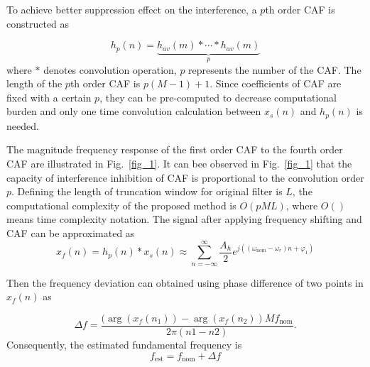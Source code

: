 \documentclass[journal,twoside]{IEEEtran}
\begin{document}
To achieve better suppression effect on the interference, a $p$th order CAF is constructed as

\begin{equation}
h_p(n)=\underbrace{h_{av}(m)*\cdots*h_{av}(m)}_{p}\label{eqn_9}
\end{equation}
where $*$ denotes convolution operation, $p$ represents the number of the CAF. The  length of the $p$th order CAF is $p(M-1)+1$. Since coefficients of CAF are fixed with a certain $p$, they can be pre-computed to decrease computational burden and only one time convolution calculation between $x_s(n)$ and $h_p(n)$ is needed. 

The magnitude frequency response of the first order CAF to the fourth order CAF are illustrated in Fig.~\ref{fig_1}. It can bee observed in Fig.~\ref{fig_1} that the capacity of interference inhibition  of CAF is proportional to the convolution order $p$. Defining the length of truncation window  for original filter is $L$, the computational complexity of the proposed method is $O(pML)$, where  $O( )$ means time complexity
notation.
The signal after applying frequency shifting and CAF  can be approximated  as
\begin{equation}
x_f(n)=h_p(n)*x_s(n)\approx\sum_{n=-\infty}^{\infty}\dfrac{A_h}{2}e^{j\left((\omega_\mathrm{nom}-\omega_r)n+\varphi_1\right)}\label{eqn_10}
\end{equation}


Then the frequency deviation can obtained using phase difference of two points in $x_f(n)$ as

\begin{equation}
\Delta f=\dfrac{(\arg(x_f(n_1))-\arg(x_f(n_2))Mf_\mathrm{nom}}{2\pi(n1-n2)}.\label{eqn_12}
\end{equation}
Consequently, the estimated fundamental frequency is
\begin{equation}
f_\mathrm{est}=f_\mathrm{nom}+\Delta f\label{eqn_13}
\end{equation}
\end{document}
